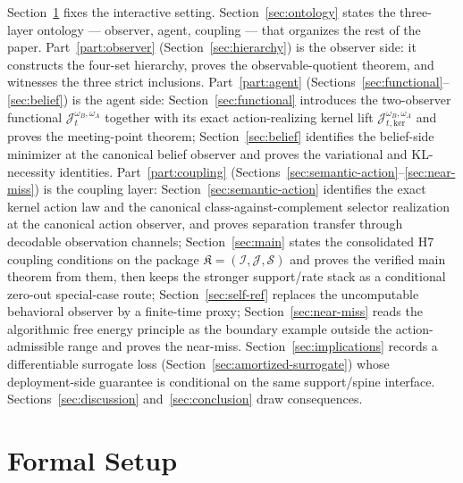 \documentclass[11pt]{article}
\theoremstyle{definition}
\theoremstyle{remark}
\newcommand{\Scal}{\mathcal{S}}
\begin{document}
Section~\ref{sec:setup} fixes the interactive setting. Section~\ref{sec:ontology} states the three-layer ontology --- observer, agent, coupling --- that organizes the rest of the paper. Part~\ref{part:observer} (Section~\ref{sec:hierarchy}) is the observer side: it constructs the four-set hierarchy, proves the observable-quotient theorem, and witnesses the three strict inclusions. Part~\ref{part:agent} (Sections~\ref{sec:functional}--\ref{sec:belief}) is the agent side: Section~\ref{sec:functional} introduces the two-observer functional $\mathcal J_t^{\omega_B,\omega_A}$ together with its exact action-realizing kernel lift $\mathcal J_{t,\mathrm{ker}}^{\omega_B,\omega_A}$ and proves the meeting-point theorem; Section~\ref{sec:belief} identifies the belief-side minimizer at the canonical belief observer and proves the variational and KL-necessity identities. Part~\ref{part:coupling} (Sections~\ref{sec:semantic-action}--\ref{sec:near-miss}) is the coupling layer: Section~\ref{sec:semantic-action} identifies the exact kernel action law and the canonical class-against-complement selector realization at the canonical action observer, and proves separation transfer through decodable observation channels; Section~\ref{sec:main} states the consolidated H7 coupling conditions on the package $\mathfrak K=(\mathcal I,\mathcal J,\Scal)$ and proves the verified main theorem from them, then keeps the stronger support/rate stack as a conditional zero-out special-case route; Section~\ref{sec:self-ref} replaces the uncomputable behavioral observer by a finite-time proxy; Section~\ref{sec:near-miss} reads the algorithmic free energy principle as the boundary example outside the action-admissible range and proves the near-miss. Section~\ref{sec:implications} records a differentiable surrogate loss (Section~\ref{sec:amortized-surrogate}) whose deployment-side guarantee is conditional on the same support/spine interface. Sections~\ref{sec:discussion} and~\ref{sec:conclusion} draw consequences.

\section{Formal Setup}
\label{sec:setup}
\end{document}
